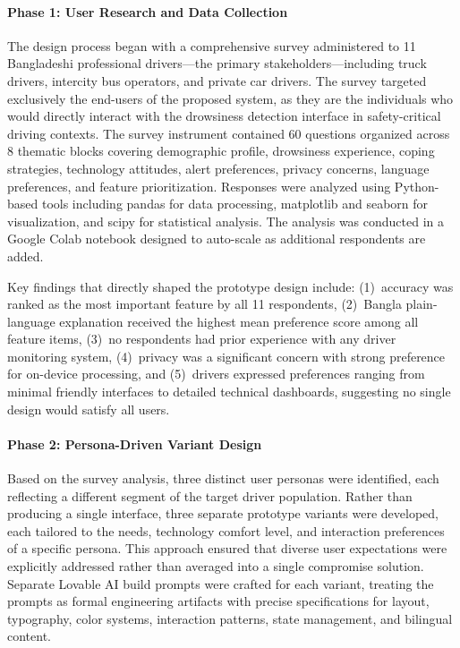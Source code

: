 \documentclass[sigconf]{acmart}
\begin{document}
\paragraph{Phase 1: User Research and Data Collection}
The design process began with a comprehensive survey administered to 11 Bangladeshi professional drivers---the primary stakeholders---including truck drivers, intercity bus operators, and private car drivers. The survey targeted exclusively the end-users of the proposed system, as they are the individuals who would directly interact with the drowsiness detection interface in safety-critical driving contexts. The survey instrument contained 60 questions organized across 8 thematic blocks covering demographic profile, drowsiness experience, coping strategies, technology attitudes, alert preferences, privacy concerns, language preferences, and feature prioritization. Responses were analyzed using Python-based tools including pandas for data processing, matplotlib and seaborn for visualization, and scipy for statistical analysis. The analysis was conducted in a Google Colab notebook designed to auto-scale as additional respondents are added.

Key findings that directly shaped the prototype design include: (1)~accuracy was ranked as the most important feature by all 11 respondents, (2)~Bangla plain-language explanation received the highest mean preference score among all feature items, (3)~no respondents had prior experience with any driver monitoring system, (4)~privacy was a significant concern with strong preference for on-device processing, and (5)~drivers expressed preferences ranging from minimal friendly interfaces to detailed technical dashboards, suggesting no single design would satisfy all users.

\paragraph{Phase 2: Persona-Driven Variant Design}
Based on the survey analysis, three distinct user personas were identified, each reflecting a different segment of the target driver population. Rather than producing a single interface, three separate prototype variants were developed, each tailored to the needs, technology comfort level, and interaction preferences of a specific persona. This approach ensured that diverse user expectations were explicitly addressed rather than averaged into a single compromise solution. Separate Lovable AI build prompts were crafted for each variant, treating the prompts as formal engineering artifacts with precise specifications for layout, typography, color systems, interaction patterns, state management, and bilingual content.
\end{document}
